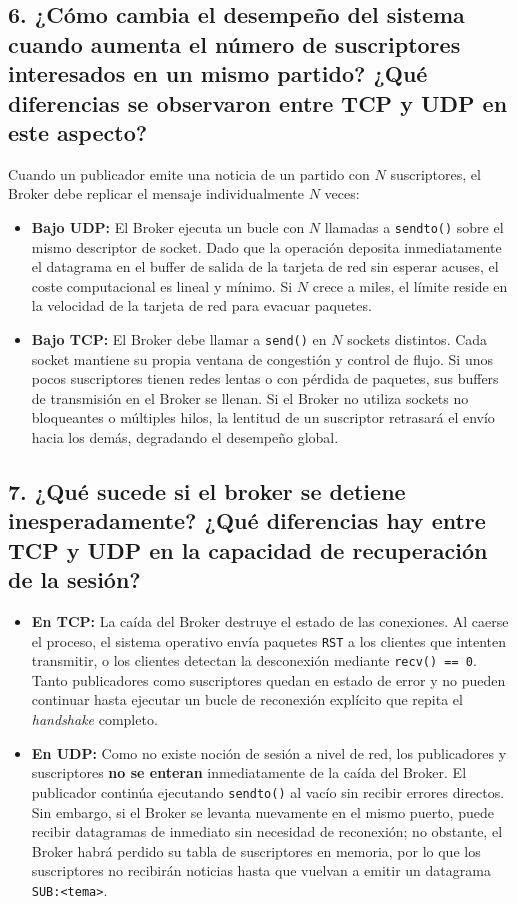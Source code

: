 \documentclass[11pt,a4paper]{article}
\begin{document}
\subsection{6. ¿Cómo cambia el desempeño del sistema cuando aumenta el número de suscriptores interesados en un mismo partido? ¿Qué diferencias se observaron entre TCP y UDP en este aspecto?}
Cuando un publicador emite una noticia de un partido con $N$ suscriptores, el Broker debe replicar el mensaje individualmente $N$ veces:
\begin{itemize}
    \item \textbf{Bajo UDP:} El Broker ejecuta un bucle con $N$ llamadas a \texttt{sendto()} sobre el mismo descriptor de socket. Dado que la operación deposita inmediatamente el datagrama en el buffer de salida de la tarjeta de red sin esperar acuses, el coste computacional es lineal y mínimo. Si $N$ crece a miles, el límite reside en la velocidad de la tarjeta de red para evacuar paquetes.
    \item \textbf{Bajo TCP:} El Broker debe llamar a \texttt{send()} en $N$ sockets distintos. Cada socket mantiene su propia ventana de congestión y control de flujo. Si unos pocos suscriptores tienen redes lentas o con pérdida de paquetes, sus buffers de transmisión en el Broker se llenan. Si el Broker no utiliza sockets no bloqueantes o múltiples hilos, la lentitud de un suscriptor retrasará el envío hacia los demás, degradando el desempeño global.
\end{itemize}

\subsection{7. ¿Qué sucede si el broker se detiene inesperadamente? ¿Qué diferencias hay entre TCP y UDP en la capacidad de recuperación de la sesión?}
\begin{itemize}
    \item \textbf{En TCP:} La caída del Broker destruye el estado de las conexiones. Al caerse el proceso, el sistema operativo envía paquetes \texttt{RST} a los clientes que intenten transmitir, o los clientes detectan la desconexión mediante \texttt{recv() == 0}. Tanto publicadores como suscriptores quedan en estado de error y no pueden continuar hasta ejecutar un bucle de reconexión explícito que repita el \textit{handshake} completo.
    \item \textbf{En UDP:} Como no existe noción de sesión a nivel de red, los publicadores y suscriptores \textbf{no se enteran} inmediatamente de la caída del Broker. El publicador continúa ejecutando \texttt{sendto()} al vacío sin recibir errores directos. Sin embargo, si el Broker se levanta nuevamente en el mismo puerto, puede recibir datagramas de inmediato sin necesidad de reconexión; no obstante, el Broker habrá perdido su tabla de suscriptores en memoria, por lo que los suscriptores no recibirán noticias hasta que vuelvan a emitir un datagrama \texttt{SUB:<tema>}.
\end{itemize}
\end{document}
